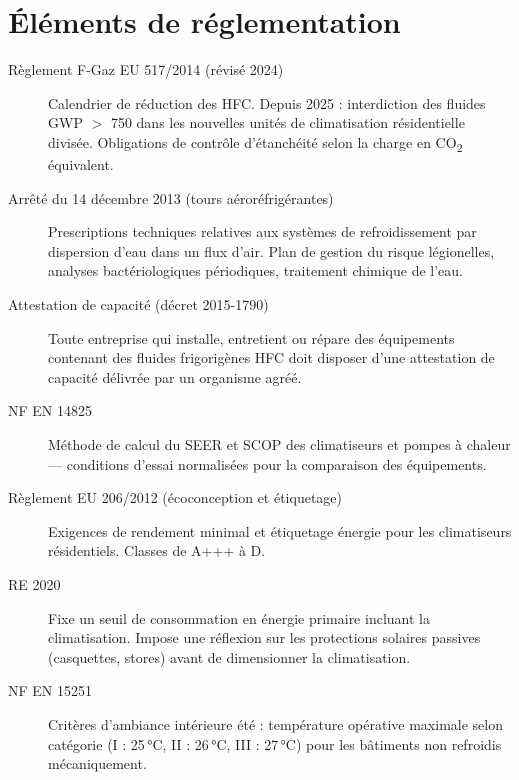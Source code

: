 \section{Éléments de réglementation}

\begin{description}
  \item[Règlement F-Gaz EU 517/2014 (révisé 2024)] Calendrier de réduction des HFC. Depuis 2025 : interdiction des fluides GWP $>$ 750 dans les nouvelles unités de climatisation résidentielle divisée. Obligations de contrôle d'étanchéité selon la charge en CO\textsubscript{2} équivalent.

  \item[Arrêté du 14 décembre 2013 (tours aéroréfrigérantes)] Prescriptions techniques relatives aux systèmes de refroidissement par dispersion d'eau dans un flux d'air. Plan de gestion du risque légionelles, analyses bactériologiques périodiques, traitement chimique de l'eau.

  \item[Attestation de capacité (décret 2015-1790)] Toute entreprise qui installe, entretient ou répare des équipements contenant des fluides frigorigènes HFC doit disposer d'une attestation de capacité délivrée par un organisme agréé.

  \item[NF EN 14825] Méthode de calcul du SEER et SCOP des climatiseurs et pompes à chaleur — conditions d'essai normalisées pour la comparaison des équipements.

  \item[Règlement EU 206/2012 (écoconception et étiquetage)] Exigences de rendement minimal et étiquetage énergie pour les climatiseurs résidentiels. Classes de A+++ à D.

  \item[RE 2020] Fixe un seuil de consommation en énergie primaire incluant la climatisation. Impose une réflexion sur les protections solaires passives (casquettes, stores) avant de dimensionner la climatisation.

  \item[NF EN 15251] Critères d'ambiance intérieure été : température opérative maximale selon catégorie (I : 25\,°C, II : 26\,°C, III : 27\,°C) pour les bâtiments non refroidis mécaniquement.
\end{description}

